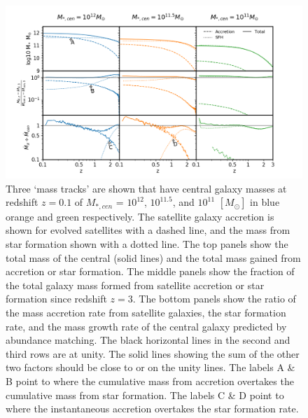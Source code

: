 \begin{figure}[h]
	\centering
	\includegraphics[width = \linewidth]{Figures/Chapter4/SatelliteAccretion_G19.png}
    \caption{Three `mass tracks' are shown that have central galaxy masses at redshift $z = 0.1$ of $M_{*,cen}$ = $10^{12}$, $10^{11.5}$, and $10^{11}$ $[M_{\odot}]$ in blue orange and green respectively. The satellite galaxy accretion is shown for evolved satellites with a dashed line, and the mass from star formation shown with a dotted line. The top panels show the total mass of the central (solid lines) and the total mass gained from accretion or star formation. The middle panels show the fraction of the total galaxy mass formed from satellite accretion or star formation since redshift $z=3$. The bottom panels show the ratio of the mass accretion rate from satellite galaxies, the star formation rate, and the mass growth rate of the central galaxy predicted by abundance matching. The black horizontal lines in the second and third rows are at unity. The solid lines showing the sum of the other two factors should be close to or on the unity lines. The labels A \& B point to where the cumulative mass from accretion overtakes the cumulative mass from star formation. The labels C \& D point to where the instantaneous accretion overtakes the star formation rate.}
	\label{fig:SatelliteAccretion}
\end{figure}

